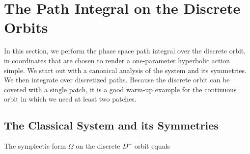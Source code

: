 \documentclass[12pt]{article}
\numberwithin{equation}{section}
\numberwithin{equation}{section}
\numberwithin{table}{section}\setlength{\multlinegap}{25pt}
\begin{document}
\section{The Path Integral on the Discrete Orbits}
\label{DiscreteOrbits}
In this section, we perform the phase space path integral over the discrete orbit, in coordinates that are chosen to render a one-parameter hyperbolic action simple.  We start out with a canonical analysis of the system and its symmetries. We then integrate over discretized paths. Because the discrete orbit can be covered with a single patch, it is a good warm-up example for the continuous orbit in which we need at least two patches.

\subsection{The Classical System and its Symmetries}
The symplectic form $\Omega$ on the discrete $D^+$ orbit equals 
\end{document}

